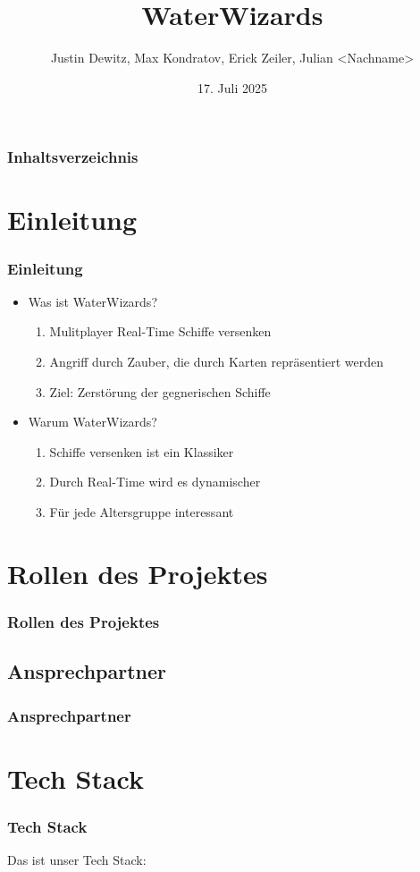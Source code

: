 \documentclass{beamer}
\title{WaterWizards}
\author{Justin Dewitz, Max Kondratov, Erick Zeiler, Julian <Nachname>}
\date{17. Juli 2025}
\begin{document}
\frame{\titlepage}

\begin{frame}
\frametitle{Inhaltsverzeichnis}
\tableofcontents
\end{frame}

\section{Einleitung}
\begin{frame}
\frametitle{Einleitung}
\begin{itemize}
  \item Was ist WaterWizards?
  \begin{enumerate}
    \item Mulitplayer Real-Time Schiffe versenken
    \item Angriff durch Zauber, die durch Karten repräsentiert werden
    \item Ziel: Zerstörung der gegnerischen Schiffe
  \end{enumerate}
  \item Warum WaterWizards?
  \begin{enumerate}
    \item Schiffe versenken ist ein Klassiker
    \item Durch Real-Time wird es dynamischer
    \item Für jede Altersgruppe interessant
  \end{enumerate}
\end{itemize}
\end{frame}

\section{Rollen des Projektes}
\begin{frame}
\frametitle{Rollen des Projektes}

\end{frame}

\subsection{Ansprechpartner}
\begin{frame}
\frametitle{Ansprechpartner}

\end{frame}

\section{Tech Stack}
\begin{frame}
\frametitle{Tech Stack}
Das ist unser Tech Stack:
\end{frame}
\end{document}
